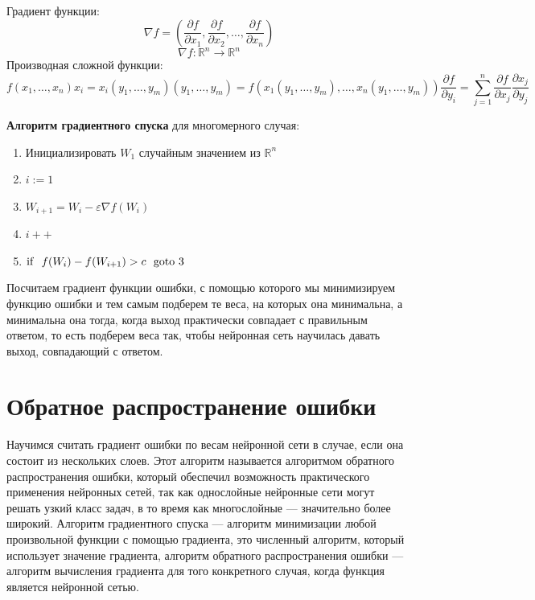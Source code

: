 \documentclass[14pt]{extreport}
\begin{document}
        Градиент функции: $$\nabla f = \left(\frac{\partial f}{\partial x_1}, \frac{\partial f}{\partial x_2}, \ldots, \frac{\partial f}{\partial x_n}\right)$$
        $$\nabla f:\mathbb{R}^n\rightarrow \mathbb{R}^n$$
        Производная сложной функции:
            \[f(x_1, \ldots, x_n)
            x_i = x_i(y_1, \ldots, y_m)
            (y_1, \ldots, y_m) = f(x_1(y_1, \ldots, y_m), \ldots, x_n(y_1, \ldots, y_m))
            \frac{\partial f}{\partial y_i} = \sum_{j=1}^{n} \frac{\partial f}{\partial x_j}\frac{\partial x_j}{\partial y_j}\]

        \textbf{
            Алгоритм градиентного спуска
        } для многомерного случая:
        \begin{enumerate}
             \item Инициализировать $W_1$ случайным значением из $\mathbb{R}^n$
             \item $i:=1$
             \item $W_{i+1}=W_i-\varepsilon \nabla f(W_i)$
             \item $i++$
             \item ${\rm if}\ \ f(W_{i})-f(W_{i+1})>c\ \ {\rm goto}\ 3$
        \end{enumerate}

        Посчитаем градиент функции ошибки, с помощью которого мы минимизируем функцию ошибки и тем самым подберем те веса, на которых она минимальна, а минимальна она тогда, когда выход практически совпадает с правильным ответом, то есть подберем веса так, чтобы нейронная сеть научилась давать выход, совпадающий с ответом.

        \section{Обратное распространение ошибки}

        Научимся считать градиент ошибки по весам нейронной сети в случае, если она состоит из нескольких слоев. Этот алгоритм называется алгоритмом обратного распространения ошибки, который обеспечил возможность практического применения нейронных сетей, так как однослойные нейронные сети могут решать узкий класс задач, в то время как многослойные --- значительно более широкий. Алгоритм градиентного спуска --- алгоритм минимизации любой произвольной функции с помощью градиента, это численный алгоритм, который использует значение градиента, алгоритм обратного распространения ошибки --- алгоритм вычисления градиента для того конкретного случая, когда функция является нейронной сетью.
\end{document}
